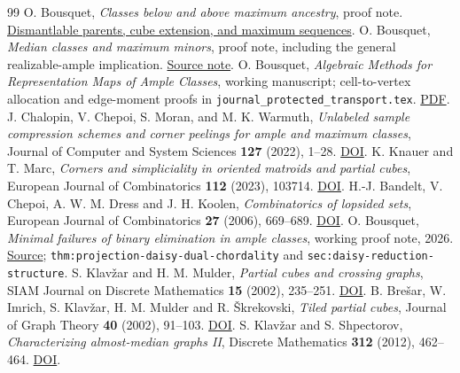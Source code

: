 \documentclass[11pt]{article}
\theoremstyle{definition}
\begin{document}
\begin{thebibliography}{99}
 O. Bousquet,
\emph{Classes below and above maximum ancestry}, proof note.
\href{https://research.obousquet.uk/repos/CompressionSchemes/drafts/round976_maxmin_neighbors.md.html}{Dismantlable parents, cube extension, and maximum sequences}.
 O. Bousquet,
\emph{Median classes and maximum minors}, proof note, including the general
realizable-ample implication.
\href{https://research.obousquet.uk/repos/CompressionSchemes/drafts/median_maximum_minor_note.md}{Source note}.
 O. Bousquet,
\emph{Algebraic Methods for Representation Maps of Ample Classes}, working manuscript;
cell-to-vertex allocation and edge-moment proofs in
\texttt{journal\_protected\_transport.tex}.
\href{../../../CompressionSchemes/algebraic_methods_ample_classes.pdf}{PDF}.
 J. Chalopin, V. Chepoi, S. Moran, and M. K. Warmuth,
\emph{Unlabeled sample compression schemes and corner peelings for ample and
maximum classes}, Journal of Computer and System Sciences \textbf{127}
(2022), 1--28. \href{https://doi.org/10.1016/j.jcss.2022.01.003}{DOI}.
 K. Knauer and T. Marc,
\emph{Corners and simpliciality in oriented matroids and partial cubes},
European Journal of Combinatorics \textbf{112} (2023), 103714.
\href{https://doi.org/10.1016/j.ejc.2023.103714}{DOI}.
 H.-J. Bandelt, V. Chepoi, A. W. M. Dress and J. H. Koolen,
\emph{Combinatorics of lopsided sets}, European Journal of Combinatorics
\textbf{27} (2006), 669--689.
\href{https://doi.org/10.1016/j.ejc.2005.03.001}{DOI}.
 O. Bousquet,
\emph{Minimal failures of binary elimination in ample classes},
working proof note, 2026.
\href{../dismantlable-ample/research/binary_elimination_locality.tex}{Source};
\texttt{thm:projection-daisy-dual-chordality} and
\texttt{sec:daisy-reduction-structure}.
 S. Klav\v{z}ar and H. M. Mulder,
\emph{Partial cubes and crossing graphs}, SIAM Journal on Discrete
Mathematics \textbf{15} (2002), 235--251.
\href{https://doi.org/10.1137/S0895480101383202}{DOI}.
 B. Bre\v{s}ar, W. Imrich, S. Klav\v{z}ar,
H. M. Mulder and R. \v{S}krekovski,
\emph{Tiled partial cubes}, Journal of Graph Theory \textbf{40} (2002), 91--103.
\href{https://doi.org/10.1002/jgt.10031}{DOI}.
 S. Klav\v{z}ar and S. Shpectorov,
\emph{Characterizing almost-median graphs II}, Discrete Mathematics
\textbf{312} (2012), 462--464.
\href{https://doi.org/10.1016/j.disc.2011.09.008}{DOI}.
\end{thebibliography}
\end{document}
